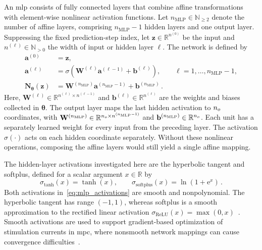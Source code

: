 An \ac{mlp} consists of fully connected layers that combine affine transformations with element-wise nonlinear activation functions.
Let $n_{\mathrm{MLP}}\in\mathbb N_{\geq 2}$ denote the number of affine layers, comprising $n_{\mathrm{MLP}}-1$ hidden layers and one output layer.
Suppressing the fixed prediction-step index, let $\mathbf{z}\in\mathbb{R}^{n^{(0)}}$ be the input and $n^{(\ell)}\in\mathbb N_{>0}$ the width of input or hidden layer $\ell$.
The network is defined by
\begin{align}
    \mathbf{a}^{(0)}
    &=\mathbf{z},\nonumber\\
    \mathbf{a}^{(\ell)}
    &=\sigma\!\left(
        \mathbf{W}^{(\ell)}\mathbf{a}^{(\ell-1)}
        +\mathbf{b}^{(\ell)}
    \right),
    \qquad \ell=1,\ldots,n_{\mathrm{MLP}}-1,\nonumber\\
    \mathbf{N}_{\boldsymbol{\theta}}(\mathbf{z})
    &=\mathbf{W}^{(n_{\mathrm{MLP}})}\mathbf{a}^{(n_{\mathrm{MLP}}-1)}
        +\mathbf{b}^{(n_{\mathrm{MLP}})}\,.
    \label{eq:mlp_layers}
\end{align}
Here, $\mathbf{W}^{(\ell)}\in\mathbb{R}^{n^{(\ell)}\times n^{(\ell-1)}}$ and $\mathbf{b}^{(\ell)}\in\mathbb{R}^{n^{(\ell)}}$ are the weights and biases collected in $\boldsymbol{\theta}$.
The output layer maps the last hidden activation to $n_{o}$ coordinates, with $\mathbf W^{(n_{\mathrm{MLP}})}\in\mathbb R^{n_{o}\times n^{(n_{\mathrm{MLP}}-1)}}$ and $\mathbf b^{(n_{\mathrm{MLP}})}\in\mathbb R^{n_{o}}$.
Each unit has a separately learned weight for every input from the preceding layer.
The activation $\sigma(\cdot)$ acts on each hidden coordinate separately.
Without these nonlinear operations, composing the affine layers would still yield a single affine mapping.

The hidden-layer activations investigated here are the hyperbolic tangent and softplus, defined for a scalar argument $x\in\mathbb R$ by
\begin{equation}
    \sigma_{\tanh}(x)=\tanh(x),
    \qquad
    \sigma_\mathrm{softplus}(x)=\ln(1+\mathrm{e}^x)\,.
    \label{eq:mlp_activations}
\end{equation}
Both activations in~\eqref{eq:mlp_activations} are smooth and nonpolynomial.
The hyperbolic tangent has range $(-1, 1)$, whereas softplus is a smooth approximation to the rectified linear activation $\sigma_\mathrm{ReLU}(x)=\max(0,x)$~\cite{Goodfellow2016}.
Smooth activations are used to support gradient-based optimization of stimulation currents in \ac{mpc}, where nonsmooth network mappings can cause convergence difficulties~\cite{Yang2022}.

